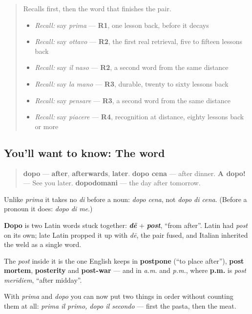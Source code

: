 \label{lesson:IT-C28-dopo}



\begin{quote}
Recalls first, then the word that finishes the pair.

\begin{itemize}
\raggedright
  \item \emph{Recall:} say \emph{prima} — \textbf{R1}, one lesson back, before it decays
  \item \emph{Recall:} say \emph{ottavo} — \textbf{R2}, the first real retrieval, five to fifteen lessons back
  \item \emph{Recall:} say \emph{il naso} — \textbf{R2}, a second word from the same distance
  \item \emph{Recall:} say \emph{la mano} — \textbf{R3}, durable, twenty to sixty lessons back
  \item \emph{Recall:} say \emph{pensare} — \textbf{R3}, a second word from the same distance
  \item \emph{Recall:} say \emph{piacere} — \textbf{R4}, recognition at distance, eighty lessons back or more
\end{itemize}
\end{quote}

\subsection*{You'll want to know: The word}
\begin{quote}
\textbf{dopo} — \textbf{after}, \textbf{afterwards}, \textbf{later}. \textbf{dopo cena} — after dinner. \textbf{A dopo!} — See you later. \textbf{dopodomani} — the day after tomorrow.
\end{quote}

Unlike \emph{prima} it takes no \emph{di} before a noun: \emph{dopo cena}, not \emph{dopo di cena}. (Before a pronoun it does: \emph{dopo di me}.)

\begin{cousinweb}
\textbf{Dopo} is two Latin words stuck together: \emph{\textbf{dē}} + \emph{\textbf{post}}, \textquotedblleft{}from after\textquotedblright{}. Latin had \emph{post} on its own; late Latin propped it up with \emph{dē}, the pair fused, and Italian inherited the weld as a single word.

The \emph{post} inside it is the one English keeps in \textbf{postpone} (\textquotedblleft{}to place after\textquotedblright{}), \textbf{post mortem}, \textbf{posterity} and \textbf{post-war} — and in \emph{a.m.} and \emph{p.m.}, where \textbf{p.m.} is \emph{post merīdiem}, \textquotedblleft{}after midday\textquotedblright{}.

With \emph{prima} and \emph{dopo} you can now put two things in order without counting them at all: \emph{prima il primo, dopo il secondo} — first the pasta, then the meat.
\end{cousinweb}

